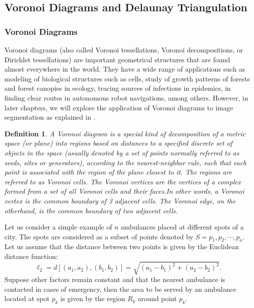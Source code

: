 \documentclass[10pt,a4paper]{article}
\newtheorem{defn}{Definition}
\begin{document}
     \subsection{Voronoi Diagrams and Delaunay Triangulation} \subsubsection{Voronoi Diagrams }  
     Voronoi diagrams (also called Voronoi tessellations, Voronoi
     decompositions, or Dirichlet tessellations) are important geometrical structures that are found almost everywhere in the world. They have a wide range of applications such as modeling of biological structures such as cells, study of growth patterns of forests and forest canopies in ecology, tracing sources of infections in epidemics, in finding clear routes in autonomous robot navigations, among others. However, in later chapters, we will explore the application of Voronoi diagrams to image segmentation as explained in \citep{stoica2011delaunay}.
     \\
     \begin{defn}
     	A Voronoi diagram is a special kind of decomposition of a metric space (or plane) into regions based on distances to a specified discrete set of objects in the space (usually denoted by a
     	set of points normally referred to as seeds, sites or generators), according to the nearest-neighbor rule, such that each point is associated with the region of the plane closest to it. The regions are referred to as Voronoi cells. The Voronoi vertices are the vertices of a complex formed from a set of all Voronoi cells and their faces.In other words, a Voronoi vertex is the common boundary of 3 adjacent cells. The Voronoi edge, on the otherhand, is the common boundary of two adjacent cells.
     \end{defn}
     Let us consider a simple example of $n$ ambulances placed at different spots of a city. The spots are considered as a subset of points denoted by $S = {p_1, p_2, \cdots, p_n}$. Let us assume that the distance between two points is given by the Euclidean distance function:
      \begin{equation}
      \ell_2 = d[(a_1,a_2),(b_1,b_2)] = \sqrt{(a_1 -b_1)^2 + (a_2 -b_2)^2}.
      \end{equation} Suppose other factors remain constant and that the nearest ambulance is contacted in cases of emergency, then the area to be served by an ambulance located at spot $p_k$ is given by the region $R_k$ around point $p_k$.
      
\end{document}
